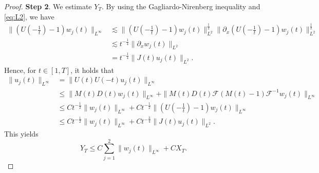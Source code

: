 \documentclass[11pt,a4paper,twosides]{amsart}
\theoremstyle{plain}
\theoremstyle{remark}
\numberwithin{equation}{section}
\def\le{\leqslant}
\theoremstyle{definition}
\newcommand{\1}{{\bf 1}_{\{|x| < |t|\}}}
\renewcommand{\epsilon}{\varepsilon}
\begin{document}
\begin{proof}
  {\bf Step 2}. We estimate $Y_T$. 
  By using the Gagliardo-Nirenberg inequality and \eqref{eq:L2}, we have
  \begin{align}\label{eq:w1}
    \|(U(-\tfrac{1}{t})-1)w_j(t)\|_{L^\infty} & \lesssim \|(U(-\tfrac{1}{t})-1)w_j(t)\|_{L^2}^\frac12\|\partial_x(U(-\tfrac{1}{t})-1)w_j(t)\|_{L^2}^\frac12 \\ \nonumber           & \lesssim t^{-\frac14}\|\partial_x w_j(t)\|_{L^2} \\ \nonumber
& = t^{-\frac14} \|J(t)u_j(t)\|_{L^2}.
  \end{align}
  Hence, for $t \in [1,T]$, it holds that
  \begin{align*}
    \|u_j(t)\|_{L^\infty}
     & = \|U(t)U(-t)u_j(t)\|_{L^\infty}                              \\
     & \le \|M(t)D(t)w_j(t)\|_{L^\infty}
    + \|M(t)D(t)\mathcal{F}(M(t)-1)\mathcal{F}^{-1}w_j(t)\|_{L^\infty} 
    \nonumber\\
     & \le Ct^{-\frac{1}{2}}\|w_j(t)\|_{L^\infty}
    + Ct^{-\frac12}\|(U(-\tfrac{1}{t})-1)w_j(t)\|_{L^\infty}  \nonumber \\
     & \le Ct^{-\frac{1}{2}}\|w_j(t)\|_{L^\infty}
    + Ct^{-\frac34}\|J(t)u_j(t)\|_{L^2}.\nonumber
  \end{align*}
This yields 
  \begin{equation}
    Y_T \le C\sum_{j=1}^2\|w_j(t)\|_{L^\infty} + CX_T.\label{yt}  
  \end{equation}


\end{proof}
\end{document}
